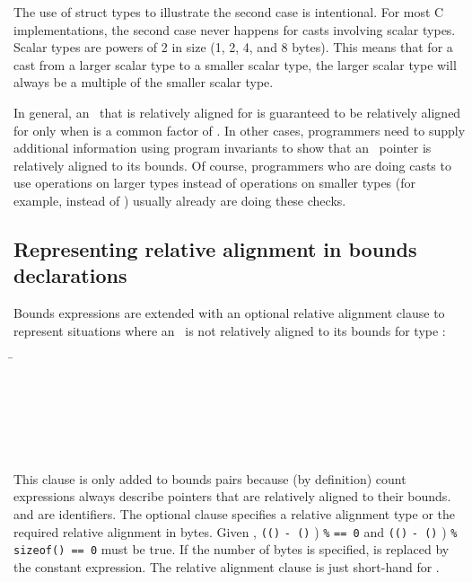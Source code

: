 The use of struct types to illustrate the second case is intentional.
For most C implementations, the second case never happens for casts
involving scalar types. Scalar types are powers of 2 in size (1, 2, 4,
and 8 bytes). This means that for a cast from a larger scalar type to a
smaller scalar type, the larger scalar type will always be a multiple of
the smaller scalar type.

In general, an
\arrayptrT\ that is
relatively aligned for  is guaranteed to be relatively aligned
for  only
when  is a common factor of
. In other cases, programmers need to
supply additional information using program invariants to show that an
\arrayptr\ pointer is relatively aligned to its bounds. Of
course, programmers who are doing casts to use operations on larger
types instead of operations on smaller types (for example, 
instead of ) usually already are doing these checks.

\subsection{Representing relative alignment in bounds declarations}
\label{section:representing-relative-alignment}

Bounds expressions are extended with an optional relative alignment
clause to represent situations where an \arrayptrT\ is not relatively
aligned to its bounds for type :

\begin{tabbing}
\=\\
\> \var{\ldots{}}\\
\> 
          \\
\\
\\
\>  \\
\> 
\end{tabbing}

This clause is only added to bounds pairs because (by definition) count
expressions always describe pointers that are relatively aligned to
their bounds.   and  are
identifiers.  The optional clause specifies a
relative alignment type  or the required relative alignment in
bytes.  Given
,
\lstinline|((|\arrayptrchar\lstinline|)|  \lstinline|- (|\arrayptrchar\lstinline|)| )
        \lstinline|%| \lstinline|== 0| and
\lstinline|((|\arrayptrchar\lstinline|)|  \lstinline|- (|\arrayptrchar\lstinline|)| )
        \lstinline|% sizeof(|\lstinline|) == 0| must be true. If the number of bytes is
specified,  is replaced by the
constant expression.  The relative alignment clause 
is just short-hand for .

